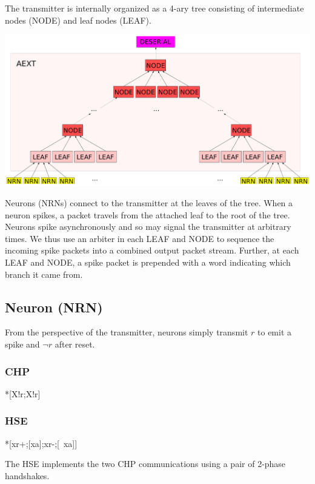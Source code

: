 \documentclass{article}
\begin{document}
The transmitter is internally organized as a 4-ary tree consisting of intermediate
nodes (NODE) and leaf nodes (LEAF).
\begin{center}
    \includegraphics[width=.7\textwidth]{img/aext.pdf}
\end{center}
Neurons (NRNs) connect to the transmitter at the leaves of the tree.
When a neuron spikes, a packet travels from the attached leaf to the root of
the tree. Neurons spike asynchronously and so may signal the transmitter at
arbitrary times. We thus use an arbiter in each LEAF and NODE to sequence the
incoming spike packets into a combined output packet stream. Further, at each
LEAF and NODE, a spike packet is prepended with a word indicating which
branch it came from.

\subsection{Neuron (NRN) \label{sec:AEXT_NRN}}

From the perspective of the transmitter, neurons simply transmit $r$ to
emit a spike and $\neg r$ after reset.

\subsubsection*{CHP}

\begin{csp}
*[X!r;X!\neg r]
\end{csp}

\subsubsection*{HSE}

\begin{hse}
*[xr+;[xa];xr-;[~xa]]
\end{hse}

\noindent
The HSE implements the two CHP communications using a pair of 2-phase handshakes.
\end{document}
